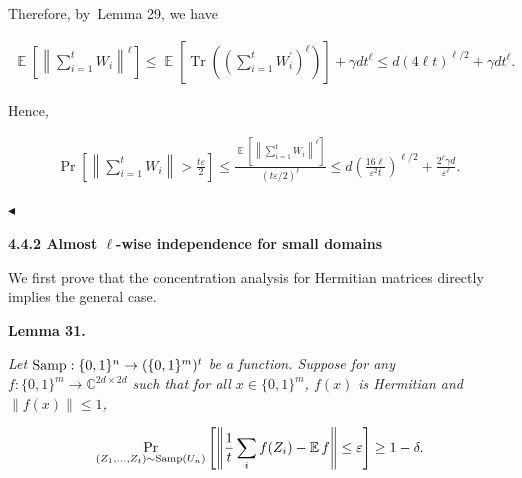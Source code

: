 \documentclass[10pt,a4paper]{article}
\begin{document}
Therefore, by Lemma 29, we have\par


\[\begin{gathered}
\operatorname*{\mathbb{E}}\left[\left\lVert\sum_{i=1}^{t}W_{i}\right\rVert^{\ell}\right]\leq\operatorname*{\mathbb{E}}\left[\operatorname*{Tr}\left(\left(\sum_{i=1}^{t}W_{i}^{\prime}\right)^{\ell}\right)\right]+\gamma dt^{\ell}\leq d\left(4\ell t\right)^{{\ell}/{2}}+\gamma dt^{\ell}.
\end{gathered}\]


Hence,\par


\[\begin{gathered}
\Pr\left[\left\lVert\sum_{i=1}^{t}W_{i}\right\rVert>\frac{t\varepsilon}{2}\right]\leq\frac{\operatorname*{\mathbb{E}}\left[\left\lVert\sum_{i=1}^{t}W_{i}\right\rVert^{\ell}\right]}{(t\varepsilon/2)^{\ell}}\leq d\left(\frac{16\ell}{\varepsilon^{2}t}\right)^{\ell/2}+\frac{2^{\ell}\gamma d}{\varepsilon^{\ell}}.\
\end{gathered}\]


$\blacktriangleleft$\par






\par\medskip\noindent\textbf{
4.4.2 Almost $\ell$-wise independence for small domains}\par




We first prove that the concentration analysis for Hermitian matrices directly implies the general case.\par





\par\medskip\noindent\textbf{
\textbf{Lemma 31}\textbf{.}
}\par



\emph{Let $\textup{{Samp}}:\{0,1\}^{n}\to(\{0,1\}^{m})^{t}$ be a function. Suppose for any $f:\{0,1\}^{m}\to\mathbb{C}^{2d\times 2d}$ such that for all $x\in\{0,1\}^{m}$, $f(x)$ is Hermitian and $\|f(x)\|\leq 1$,}\par


\[\begin{gathered}
\Pr_{(Z_{1},\dots,Z_{t})\sim\textup{{Samp}}(U_{n})}\left[\left\lVert\frac{1}{t}\sum_{i}f(Z_{i})-\operatorname*{\mathbb{E}}f\right\rVert\leq\varepsilon\right]\geq 1-\delta.
\end{gathered}\]
\end{document}

